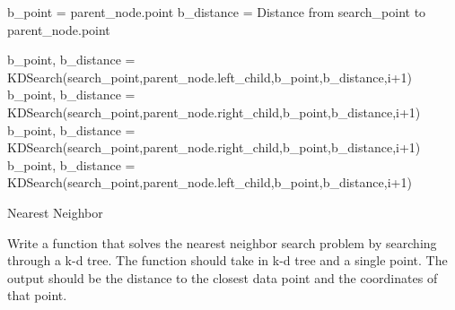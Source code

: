 \begin{algorithm}
\begin{algorithmic}[1]
        \State b\_point = parent\_node.point
        \State b\_distance = Distance from search\_point to parent\_node.point
    \EndIf

        \State b\_point, b\_distance =
            \State KDSearch(search\_point,parent\_node.left\_child,b\_point,b\_distance,i+1)
            \State b\_point, b\_distance = 
                \State KDSearch(search\_point,parent\_node.right\_child,b\_point,b\_distance,i+1)
        \EndIf
    \Else
        \State b\_point, b\_distance = 
            \State KDSearch(search\_point,parent\_node.right\_child,b\_point,b\_distance,i+1)
            \State b\_point, b\_distance = 
                \State KDSearch(search\_point,parent\_node.left\_child,b\_point,b\_distance,i+1)
        \EndIf
    \EndIf
\EndProcedure
\end{algorithmic}
\caption{Nearest Neighbor}
\label{alg:nearestneighbor}
\end{algorithm}


\begin{problem}
Write a function that solves the nearest neighbor search problem by searching through a k-d tree.
The function should take in k-d tree and a single point.
The output should be the distance to the closest data point and the coordinates of that point. 
\end{problem}

